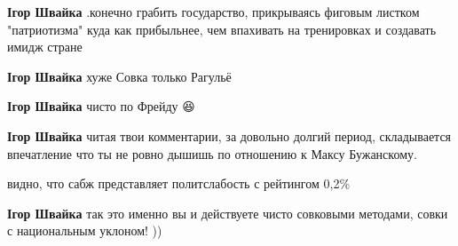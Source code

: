 \begin{itemize}
\begin{itemize}
\textbf{Ігор Швайка} .конечно грабить государство, прикрываясь фиговым листком
"патриотизма" куда как прибыльнее, чем впахивать на тренировках и создавать
имидж стране

 
\textbf{Ігор Швайка} хуже Совка только Рагульё

 
\textbf{Ігор Швайка} чисто по Фрейду 😆

 
\textbf{Ігор Швайка} читая твои комментарии, за довольно долгий период,
складывается впечатление что ты не ровно дышишь по отношению к Максу
Бужанскому.

 
видно, что сабж представляет политслабость с рейтингом 0,2\%

 
\textbf{Ігор Швайка} так это именно вы и действуете чисто совковыми методами, совки с национальным уклоном! ))

 

\end{itemize}
\end{itemize}
